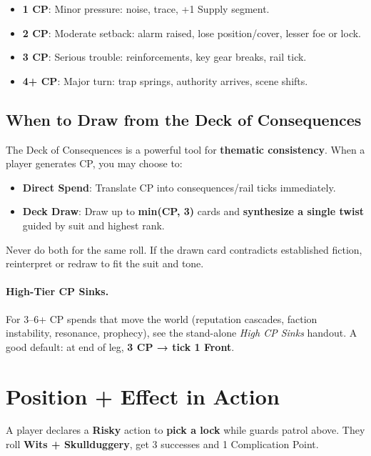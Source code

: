 \begin{itemize}
    \item \textbf{1 CP}: Minor pressure: noise, trace, +1 Supply segment.
    \item \textbf{2 CP}: Moderate setback: alarm raised, lose position/cover, lesser foe or lock.
    \item \textbf{3 CP}: Serious trouble: reinforcements, key gear breaks, rail tick.
    \item \textbf{4+ CP}: Major turn: trap springs, authority arrives, scene shifts.
\end{itemize}

\subsection*{When to Draw from the Deck of Consequences}

The Deck of Consequences is a powerful tool for \textbf{thematic consistency}. When a player generates CP, you may choose to:

\begin{itemize}
    \item \textbf{Direct Spend}: Translate CP into consequences/rail ticks immediately.
    \item \textbf{Deck Draw}: Draw up to \textbf{min(CP, 3)} cards and \textbf{synthesize a single twist} guided by suit and highest rank.
\end{itemize}

Never do both for the same roll. If the drawn card contradicts established fiction, reinterpret or redraw to fit the suit and tone.

\paragraph{High-Tier CP Sinks.}
For 3–6+ CP spends that move the world (reputation cascades, faction instability, resonance, prophecy), see the stand-alone \emph{High CP Sinks} handout. A good default: at end of leg, \textbf{3 CP → tick 1 Front}.

\section*{Position + Effect in Action}

A player declares a \textbf{Risky} action to \textbf{pick a lock} while guards patrol above. They roll \textbf{Wits + Skullduggery}, get 3 successes and 1 Complication Point.

